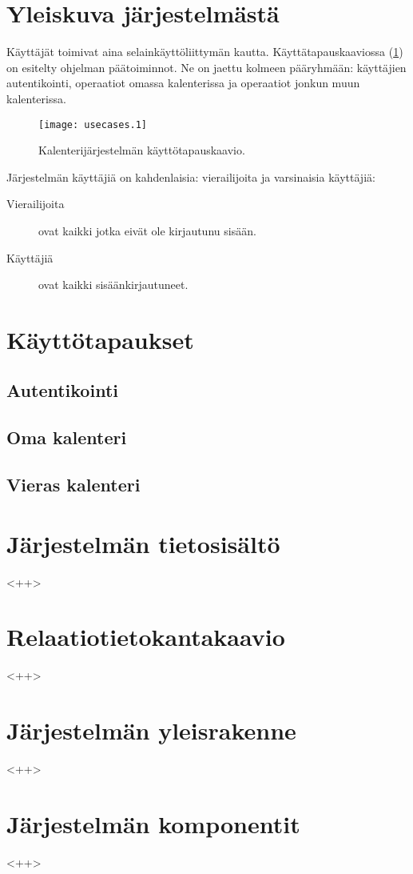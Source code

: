 \documentclass[a4paper,12pt]{report}
\begin{document}
\section{Yleiskuva järjestelmästä}
Käyttäjät toimivat aina selainkäyttöliittymän kautta. Käyttätapauskaaviossa
(\ref{graph_usecases}) on esitelty ohjelman päätoiminnot. Ne on jaettu kolmeen
pääryhmään: käyttäjien autentikointi, operaatiot omassa kalenterissa ja
operaatiot jonkun muun kalenterissa.

\begin{figure}[h]
   \centering \texttt{[image: usecases.1]}
   \caption{Kalenterijärjestelmän käyttötapauskaavio.}
   \label{graph_usecases}
\end{figure}

Järjestelmän käyttäjiä on kahdenlaisia: vierailijoita ja varsinaisia käyttäjiä:
\begin{description}
   \item[Vierailijoita] ovat kaikki jotka eivät ole kirjautunu sisään.
   \item[Käyttäjiä] ovat kaikki sisäänkirjautuneet.
\end{description}

\section{Käyttötapaukset}
\subsection{Autentikointi}
\subsection{Oma kalenteri}
\subsection{Vieras kalenteri}
\section{Järjestelmän tietosisältö} <++>
\section{Relaatiotietokantakaavio} <++>
\section{Järjestelmän yleisrakenne} <++>
\section{Järjestelmän komponentit} <++>
\end{document}
